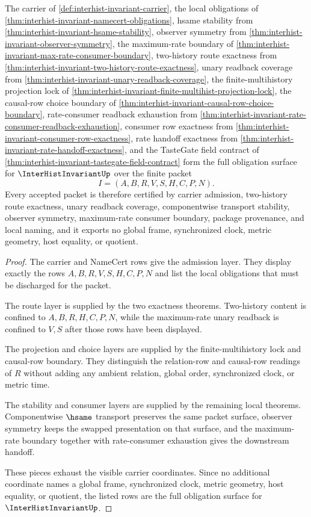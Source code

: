 \begin{theorem}
\label{thm:interhist-invariant-obligation-closure-package}
The carrier of \autoref{def:interhist-invariant-carrier}, the local obligations of \autoref{thm:interhist-invariant-namecert-obligations}, hsame stability from \autoref{thm:interhist-invariant-hsame-stability}, observer symmetry from \autoref{thm:interhist-invariant-observer-symmetry}, the maximum-rate boundary of \autoref{thm:interhist-invariant-max-rate-consumer-boundary}, two-history route exactness from \autoref{thm:interhist-invariant-two-history-route-exactness}, unary readback coverage from \autoref{thm:interhist-invariant-unary-readback-coverage}, the finite-multihistory projection lock of \autoref{thm:interhist-invariant-finite-multihist-projection-lock}, the causal-row choice boundary of \autoref{thm:interhist-invariant-causal-row-choice-boundary}, rate-consumer readback exhaustion from \autoref{thm:interhist-invariant-rate-consumer-readback-exhaustion}, consumer row exactness from \autoref{thm:interhist-invariant-consumer-row-exactness}, rate handoff exactness from \autoref{thm:interhist-invariant-rate-handoff-exactness}, and the TasteGate field contract of \autoref{thm:interhist-invariant-tastegate-field-contract} form the full obligation surface for $\InterHistInvariantUp$ over the finite packet
$$
I=(A,B,R,V,S,H,C,P,N).
$$
Every accepted packet is therefore certified by carrier admission, two-history route exactness, unary readback coverage, componentwise transport stability, observer symmetry, maximum-rate consumer boundary, package provenance, and local naming, and it exports no global frame, synchronized clock, metric geometry, host equality, or quotient.
\end{theorem}
\begin{proof}
The carrier and NameCert rows give the admission layer. They display exactly the rows $A,B,R,V,S,H,C,P,N$ and list the local obligations that must be discharged for the packet.

The route layer is supplied by the two exactness theorems. Two-history content is confined to $A,B,R,H,C,P,N$, while the maximum-rate unary readback is confined to $V,S$ after those rows have been displayed.

The projection and choice layers are supplied by the finite-multihistory lock and causal-row boundary. They distinguish the relation-row and causal-row readings of $R$ without adding any ambient relation, global order, synchronized clock, or metric time.

The stability and consumer layers are supplied by the remaining local theorems. Componentwise $\hsame$ transport preserves the same packet surface, observer symmetry keeps the swapped presentation on that surface, and the maximum-rate boundary together with rate-consumer exhaustion gives the downstream handoff.

These pieces exhaust the visible carrier coordinates. Since no additional coordinate names a global frame, synchronized clock, metric geometry, host equality, or quotient, the listed rows are the full obligation surface for $\InterHistInvariantUp$.
\end{proof}

